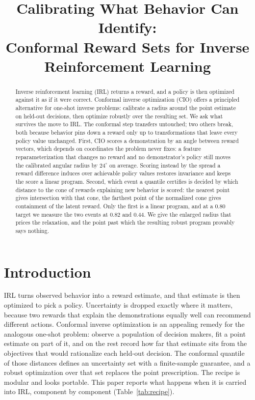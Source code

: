 \documentclass{article}
\title{Calibrating What Behavior Can Identify:\\
Conformal Reward Sets for Inverse Reinforcement Learning}
\author{}
\begin{document}
\maketitle

\begin{abstract}
Inverse reinforcement learning (IRL) returns a reward, and a policy is then
optimized against it as if it were correct. Conformal inverse optimization
(CIO) offers a principled alternative for one-shot inverse problems: calibrate
a radius around the point estimate on held-out decisions, then optimize
robustly over the resulting set. We ask what survives the move to IRL. The
conformal step transfers untouched; two others break, both because behavior
pins down a reward only up to transformations that leave every policy value
unchanged. First, CIO scores a demonstration by an angle between reward
vectors, which
depends on coordinates the problem never fixes: a feature reparameterization
that changes no reward and no demonstrator's policy still moves the calibrated
angular radius by $24^\circ$ on average. Scoring instead by the spread a reward
difference induces over achievable policy values restores invariance and keeps
the score a linear program. Second, which event a quantile certifies is decided
by which distance to the cone of rewards explaining new behavior is scored: the
nearest point gives intersection with that cone, the farthest point of the
normalized cone gives containment of the latent reward. Only the first is a
linear program, and at a $0.80$ target we measure the two events at $0.82$ and
$0.44$. We give the enlarged radius that
prices the relaxation, and the point past which the resulting robust program
provably says nothing.
\end{abstract}

\section{Introduction}

IRL turns observed behavior into a reward estimate, and that estimate is then
optimized to pick a policy. Uncertainty is dropped exactly where it matters,
because two rewards that explain the demonstrations equally well can recommend
different actions. Conformal inverse optimization \citep{lin2024conformal} is
an appealing remedy for the analogous one-shot problem: observe a population of
decision makers, fit a point estimate on part of it, and on the rest record how
far that estimate sits from the objectives that would rationalize each held-out
decision. The conformal quantile of those distances defines an uncertainty set
with a finite-sample guarantee, and a robust optimization over that set replaces
the point prescription. The recipe is modular and looks portable. This paper
reports what happens when it is carried into IRL, component by component
(Table~\ref{tab:recipe}).
\end{document}
